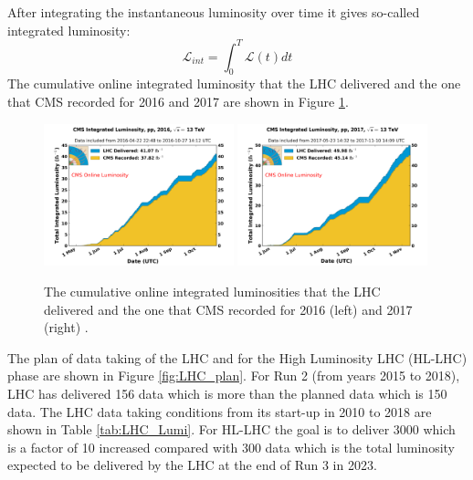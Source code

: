 After integrating the instantaneous luminosity over time it gives so-called integrated luminosity:
\begin{equation}
\mathcal{L}_{int}=\int_{0}^{T}\mathcal{L}(t)dt
\label{eq:Integrated_Lumi}
\end{equation}
The cumulative online integrated luminosity that the LHC delivered and the one that CMS recorded for 2016 and 2017 are shown in Figure \ref{fig:LHC_luminosity}.
\begin{figure}[h!]
\begin{center}
\includegraphics[width=0.49\textwidth]{figures/LHC/int_lumi_per_day_cumulative_pp_2016OnlineLumi.png}
\includegraphics[width=0.49\textwidth]{figures/LHC/int_lumi_per_day_cumulative_pp_2017OnlineLumi.png}
\caption{The cumulative online integrated luminosities that the LHC delivered and the one that CMS recorded for 2016 (left) and 2017 (right) \cite{CMS_Luminosity}.}
\label{fig:LHC_luminosity}
\end{center}
\end{figure}

The plan of data taking of the LHC and for the High Luminosity LHC (HL-LHC) phase are shown in Figure \ref{fig:LHC_plan}. For Run 2 (from years 2015 to 2018), LHC has delivered 156 \fbinv data which is more than the planned data which is 150 \fbinv data. The LHC data taking conditions from its start-up in 2010 to 2018 are shown in Table \ref{tab:LHC_Lumi}. For HL-LHC the goal is to deliver 3000 \fbinv which is a factor of 10 increased compared with 300 \fbinv data which is the total luminosity expected to be delivered by the LHC at the end of Run 3 in 2023.




